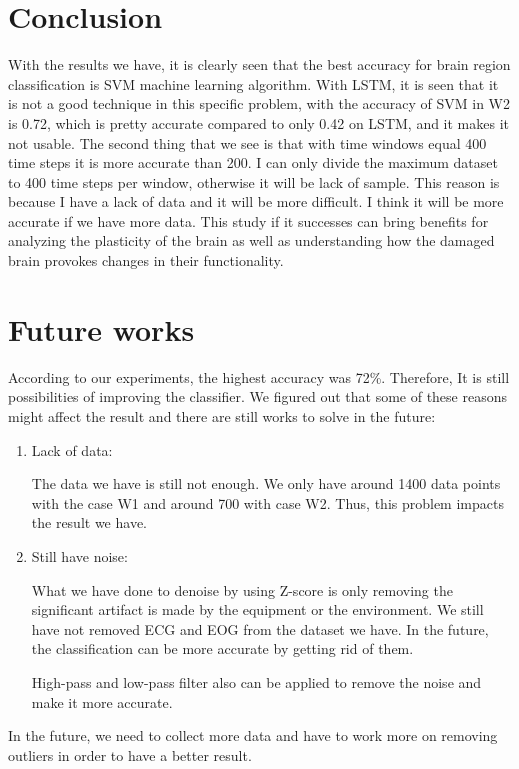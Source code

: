 \section{Conclusion}

With the results we have, it is clearly seen that the best accuracy for brain region classification is SVM machine learning algorithm. With LSTM, it is seen that it is not a good technique in this specific problem, with the accuracy of SVM in W2 is 0.72, which is pretty accurate compared to only 0.42 on LSTM, and it makes it not usable. The second thing that we see is that with time windows equal 400 time steps it is more accurate than 200. I can only divide the maximum dataset to 400 time steps per window, otherwise it will be lack of sample. This reason is because I have a lack of data and it will be more difficult. I think it will be more accurate if we have more data. This study if it successes can bring benefits for analyzing the plasticity of the brain as well as understanding how the damaged brain provokes changes in their functionality. 

\section{Future works}
According to our experiments, the highest accuracy was 72\%. Therefore, It is still possibilities of improving the classifier. We figured out that some of these reasons might affect the result and there are still works to solve in the future:

\begin{enumerate}
    \item Lack of data:
    
            The data we have is still not enough. We only have around 1400 data points with the case W1 and around 700 with case W2. Thus, this problem impacts the result we have.
    \item Still have noise:
    
            What we have done to denoise by using Z-score is only removing the significant artifact is made by the equipment or the environment. We still have not removed ECG and EOG from the dataset we have. In the future, the classification can be more accurate by getting rid of them.
            
            High-pass and low-pass filter also can be applied to remove the noise and make it more accurate.
\end{enumerate}

In the future, we need to collect more data and have to work more on removing outliers in order to have a better result.